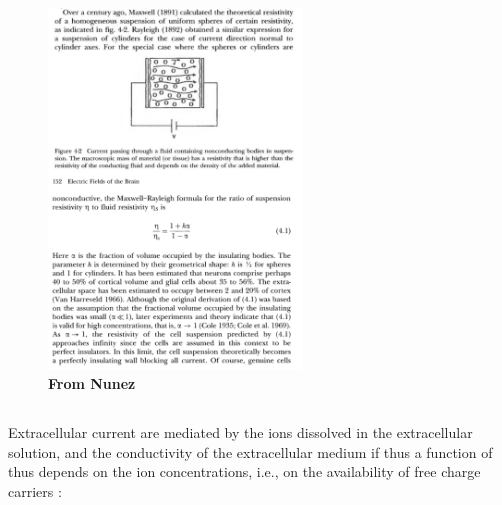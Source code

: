 \begin{figure}[!ht]
\begin{center}
\includegraphics[width=0.6\textwidth]{Figures/Sigma/resistivity_maxwell.png}
\end{center}
\caption{\textbf{From Nunez} }
\label{Sigma:fig:maxwell_resistivity}
\end{figure}

\subsection{ }



\subsection{ }
\label{sec:Sigma:concentrationbased}

Extracellular current are mediated by the ions dissolved in the extracellular solution, and the conductivity of the extracellular medium if thus a function of thus depends on the ion concentrations, i.e., on the availability of free charge carriers \citep{Grodzinsky2011}: 

